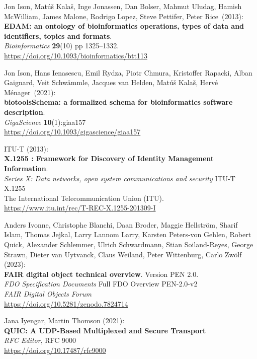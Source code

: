 \begin{thebibliography}{9}
Jon Ison, Matúš Kalaš, Inge Jonassen, Dan Bolser, Mahmut
Uludag, Hamish McWilliam, James Malone, Rodrigo Lopez, Steve Pettifer,
Peter Rice~(2013):\\
\textbf{EDAM: an ontology of bioinformatics operations, types of data
and identifiers, topics and formats}.\\
\emph{Bioinformatics} \textbf{29}(10) pp 1325--1332.\\
\url{https://doi.org/10.1093/bioinformatics/btt113}

Jon Ison, Hans Ienasescu, Emil Rydza, Piotr Chmura, Kristoffer
Rapacki, Alban Gaignard, Veit Schwämmle, Jacques van Helden, Matúš
Kalaš, Hervé Ménager~(2021):\\
\textbf{biotoolsSchema: a formalized schema for bioinformatics software description}.\\
\emph{GigaScience} \textbf{10}(1):giaa157\\
\url{https://doi.org/10.1093/gigascience/giaa157}

ITU-T (2013): \\
\textbf{X.1255 : Framework for Discovery of Identity Management Information}.\\
\emph{Series X: Data networks, open system communications and security} ITU-T X.1255 \\
The International Telecommunication Union (ITU).\\
\url{https://www.itu.int/rec/T-REC-X.1255-201309-I}

Anders Ivonne, Christophe Blanchi, Daan Broder, Maggie Hellström, Sharif Islam, Thomas Jejkal, Larry Lannom Larry, Karsten Peters-von Gehlen, Robert Quick,
Alexander Schlemmer, Ulrich Schwardmann, Stian Soiland-Reyes,
George Strawn, Dieter van Uytvanck, Claus Weiland, Peter Wittenburg,
Carlo Zwölf (2023): \\
\textbf{{FAIR} digital object technical overview}. Version PEN 2.0.\\
\emph{FDO Specification Documents} Full FDO Overview PEN-2.0-v2 \\
\emph{FAIR Digital Objects Forum}\\
\url{https://doi.org/10.5281/zenodo.7824714}

Jana Iyengar, Martin Thomson (2021): \\
\textbf{{QUIC}: {A UDP-Based Multiplexed} and {Secure Transport}}\\
\emph{RFC Editor}, RFC 9000\\
\url{https://doi.org/10.17487/rfc9000}



\end{thebibliography}
